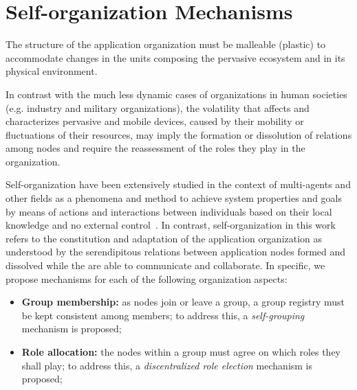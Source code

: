 \section{Self-organization Mechanisms}\label{sec:self_organization}

The structure of the application organization
must be malleable (plastic) to accommodate changes in the units composing the pervasive ecosystem and in its physical environment. 

In contrast with the much less dynamic cases of organizations in human societies (e.g. industry and military organizations), the volatility that affects and characterizes pervasive and mobile devices, caused by their mobility or fluctuations of their resources, may imply the formation or dissolution of relations among nodes and require the reassessment of the roles they play in the organization.

Self-organization have been extensively studied in the context of multi-agents and other fields as a phenomena and method to achieve system properties and goals by means of actions and interactions between individuals based on their local knowledge and no external control~\cite{DiMarzoSerugendo:2005, Banzhaf:2009}. In contrast, self-organization in this work refers to the constitution and adaptation of the application organization as understood by the serendipitous relations between application nodes formed and dissolved while the are able to communicate and collaborate. In specific, we propose mechanisms for each of the following organization aspects:

\begin{itemize}
	
	\item \textbf{Group membership:} as nodes join or leave a group, a group registry must be kept consistent among members;
	to address this, a \textit{self-grouping} mechanism is proposed;
	
	\item \textbf{Role allocation:} the nodes within a group must agree on which roles they shall play; to address this, a  \textit{discentralized role election} mechanism is proposed;
		
\end{itemize}


